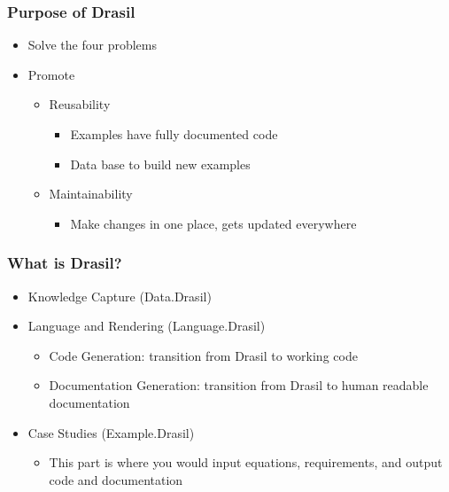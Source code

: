 \documentclass{beamer}
\begin{document}
\begin{frame}
\frametitle{Purpose of Drasil}
\begin{itemize}
 \item Solve the four problems
 \item Promote
  \begin{itemize}
   \item Reusability 
    \begin{itemize}  
     \item Examples have fully documented code
     \item Data base to build new examples
    \end{itemize}
   \item Maintainability 
    \begin{itemize}
     \item Make changes in one place, gets updated everywhere
    \end{itemize}
  \end{itemize}
\end{itemize}
\end{frame}

\begin{frame}
\frametitle{What is Drasil?}
\begin{itemize}
 \item<1-> Knowledge Capture (Data.Drasil)
 \item<2-> Language and Rendering (Language.Drasil)
  \begin{itemize}
   \item Code Generation: transition from Drasil to working code
   \item Documentation Generation: transition from Drasil to human readable documentation
  \end{itemize}
 \item<3-> Case Studies (Example.Drasil)
  \begin{itemize}
   \item This part is where you would input equations, requirements, and output code and documentation
  \end{itemize}
\end{itemize}
\end{frame}
\end{document}
